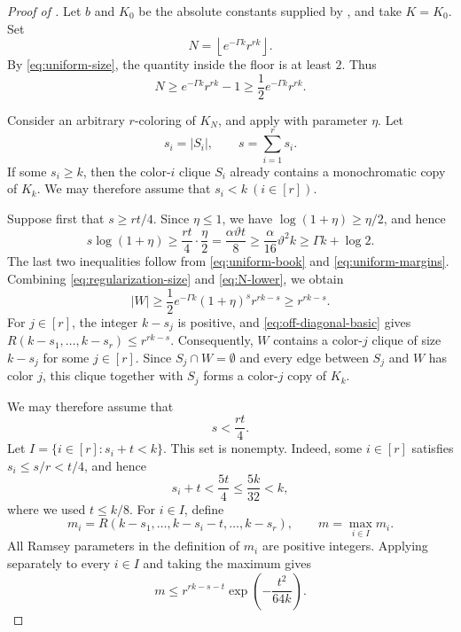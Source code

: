 \documentclass[twoside,12pt]{article}
\theoremstyle{definition}
\theoremstyle{remark}
\newcommand{\1}{\mathbf 1}
\begin{document}
\begin{proof}[Proof of ]
Let $b$ and $K_0$ be the absolute constants supplied by
, and take $K=K_0$. Set
\begin{equation}\label{eq:N-floor}
 N=\left\lfloor e^{-\Gamma k}r^{rk}\right\rfloor.
\end{equation}
By \eqref{eq:uniform-size}, the quantity inside the floor is at least $2$.
Thus
\begin{equation}\label{eq:N-lower}
 N\ge e^{-\Gamma k}r^{rk}-1
 \ge\frac12e^{-\Gamma k}r^{rk}.
\end{equation}

Consider an arbitrary $r$-coloring of $K_N$, and apply
 with parameter $\eta$. Let
\[
 s_i=|S_i|,
 \qquad
 s=\sum_{i=1}^rs_i.
\]
If some $s_i\ge k$, then the color-$i$ clique $S_i$ already contains a
monochromatic copy of $K_k$. We may therefore assume that
$
 s_i<k
~(i\in[r]).
$

Suppose first that $s\ge rt/4$. Since $\eta\le1$, we have
$\log(1+\eta)\ge\eta/2$, and hence
\[
 s\log(1+\eta)
 \ge\frac{rt}{4}\cdot\frac\eta2
 =\frac{\alpha\vartheta t}{8}
 \ge\frac{\alpha}{16}\vartheta^2k
 \ge\Gamma k+\log2.
\]
The last two inequalities follow from \eqref{eq:uniform-book} and
\eqref{eq:uniform-margins}. Combining
\eqref{eq:regularization-size} and \eqref{eq:N-lower}, we obtain
\[
 |W|
 \ge\frac12e^{-\Gamma k}(1+\eta)^sr^{rk-s}
 \ge r^{rk-s}.
\]
For $j\in[r]$, the integer $k-s_j$ is positive, and
\eqref{eq:off-diagonal-basic} gives
$
 R(k-s_1,\ldots,k-s_r)\le r^{rk-s}.
$
Consequently, $W$ contains a color-$j$ clique of size $k-s_j$ for some
$j\in[r]$. Since $S_j\cap W=\emptyset$ and every edge between $S_j$ and
$W$ has color $j$, this clique together with $S_j$ forms a color-$j$ copy of
$K_k$.

We may therefore assume that
\begin{equation}\label{eq:small-spine}
 s<\frac{rt}{4}.
\end{equation}
Let
$
 I=\{i\in[r]:s_i+t<k\}.
$
This set is nonempty. Indeed, some $i\in[r]$ satisfies
$s_i\le s/r<t/4$, and hence
\[
 s_i+t<\frac{5t}{4}\le\frac{5k}{32}<k,
\]
where we used $t\le k/8$. For $i\in I$, define
\[
 m_i=R(k-s_1,\ldots,k-s_i-t,\ldots,k-s_r),
 \qquad
 m=\max_{i\in I}m_i.
\]
All Ramsey parameters in the definition of $m_i$ are positive integers.
Applying  separately to every $i\in I$ and taking
the maximum gives
\begin{equation}\label{eq:m-bound}
 m\le r^{rk-s-t}
 \exp\!\left(-\frac{t^2}{64k}\right).
\end{equation}


\end{proof}
\end{document}
